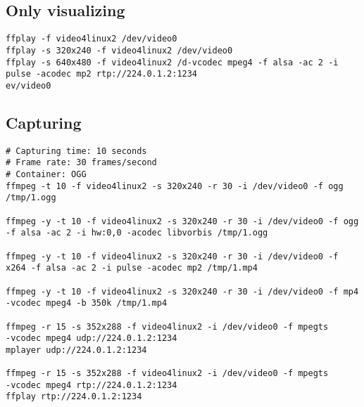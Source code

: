 \subsection{Only visualizing}
\begin{verbatim}
ffplay -f video4linux2 /dev/video0
ffplay -s 320x240 -f video4linux2 /dev/video0
ffplay -s 640x480 -f video4linux2 /d-vcodec mpeg4 -f alsa -ac 2 -i pulse -acodec mp2 rtp://224.0.1.2:1234
ev/video0
\end{verbatim}

\subsection{Capturing}
\begin{verbatim}
# Capturing time: 10 seconds
# Frame rate: 30 frames/second
# Container: OGG
ffmpeg -t 10 -f video4linux2 -s 320x240 -r 30 -i /dev/video0 -f ogg /tmp/1.ogg

ffmpeg -y -t 10 -f video4linux2 -s 320x240 -r 30 -i /dev/video0 -f ogg
-f alsa -ac 2 -i hw:0,0 -acodec libvorbis /tmp/1.ogg

ffmpeg -y -t 10 -f video4linux2 -s 320x240 -r 30 -i /dev/video0 -f
x264 -f alsa -ac 2 -i pulse -acodec mp2 /tmp/1.mp4

ffmpeg -y -t 10 -f video4linux2 -s 320x240 -r 30 -i /dev/video0 -f mp4 -vcodec mpeg4 -b 350k /tmp/1.mp4

ffmpeg -r 15 -s 352x288 -f video4linux2 -i /dev/video0 -f mpegts
-vcodec mpeg4 udp://224.0.1.2:1234
mplayer udp://224.0.1.2:1234

ffmpeg -r 15 -s 352x288 -f video4linux2 -i /dev/video0 -f mpegts
-vcodec mpeg4 rtp://224.0.1.2:1234
ffplay rtp://224.0.1.2:1234


\end{verbatim}

